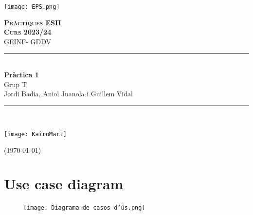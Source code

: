 \documentclass[12pt,a4paper]{article}
\begin{document}
    \begin{titlepage}
        \newcommand{\HRule}{\rule{\linewidth}{0.5mm}} %
        \begin{flushleft}
            \texttt{[image: EPS.png]}\\\vfill
        \end{flushleft}
        \center %
        \textsc{\huge \bfseries Pràctiques ESII}\\[0.25cm]
        \textsc{\Large \bfseries Curs 2023/24}\\[0.25cm]
        \textsc{\large GEINF- GDDV }
        \HRule \\[0.4cm]
        { \huge \bfseries Pràctica 1} \\[0.4cm] %
Grup T \\ Jordi Badia, Aniol Juanola i Guillem Vidal
        \HRule \\\vfill
        \begin{minipage}{0.4\textwidth}
            \begin{flushleft}
                \texttt{[image: KairoMart]}
            \end{flushleft}
        \end{minipage}
        \hfill
        \begin{minipage}{0.4\textwidth}
            \begin{flushright} \large
                {\small (\today)}
            \end{flushright}
        \end{minipage}
    \end{titlepage}


\tableofcontents

\clearpage


\section{Use case diagram}

\begin{figure}[ht]
    \centering
    \texttt{[image: Diagrama de casos d'ús.png]}
\end{figure}
\end{document}
